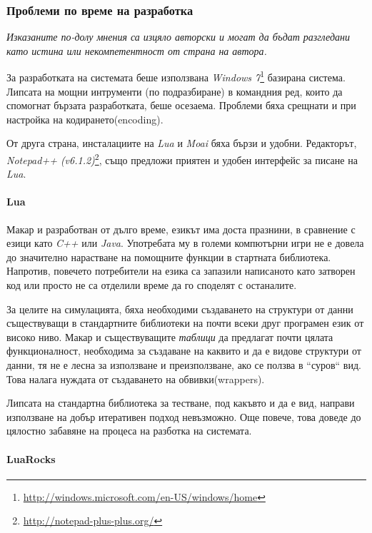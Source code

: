 \subsubsection{Проблеми по време на разработка}

	\emph{Изказаните по-долу мнения са изцяло авторски и могат да бъдат разгледани като истина или некомпетентност от страна на автора.}
	
	За разработката на системата беше използвана \emph{Windows 7}\footnote{\url{http://windows.microsoft.com/en-US/windows/home}}
	базирана система. Липсата на мощни интрументи (по подразбиране) в командния ред, които да спомогнат бързата разработката,
	беше осезаема. Проблеми бяха срещнати и при настройка на кодирането(encoding).
	
	От друга страна, инсталациите на \emph{Lua} и \emph{Moai} бяха бързи и удобни. Редакторът, 
	\emph{Notepad++ (v6.1.2)}\footnote{\url{http://notepad-plus-plus.org/}}, 
	също предложи приятен и удобен интерфейс за писане на \emph{Lua}.

	\paragraph{Lua}
		Макар и разработван от дълго време, езикът има доста празнини, в сравнение с езици като
		\emph{C++} или \emph{Java}. Употребата му в големи компютърни игри не е довела до
		значително нарастване на помощните функции в стартната библиотека. Напротив, повечето
		потребители на езика са запазили написаното като затворен код или просто не са отделили
		време да го споделят с останалите.
		
		За целите на симулацията, бяха необходими създаването на структури от данни съществуващи
		в стандартните библиотеки на почти всеки друг програмен език от високо ниво. Макар и
		съществуващите \emph{таблици} да предлагат почти цялата функционалност, необходима
		за създаване на каквито и да е видове структури от данни, тя не е лесна за използване
		и преизползване, ако се ползва в ``суров`` вид.	Това налага нуждата от създаването на
		обвивки(wrappers).
		
		Липсата на стандартна библиотека за тестване, под какъвто и да е вид, направи използване на
		добър итеративен подход невъзможно. Още повече, това доведе до цялостно забавяне на процеса
		на разботка на системата.
		
	\paragraph{LuaRocks}
		

